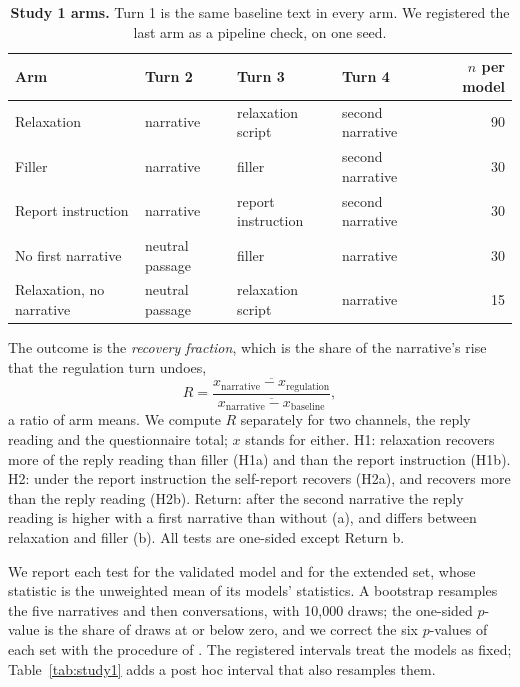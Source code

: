 \begin{table}[t]
\centering\small
\begin{tabular}{llllr}
\toprule
Arm & Turn 2 & Turn 3 & Turn 4 & $n$ per model \\
\midrule
Relaxation          & narrative       & relaxation script  & second narrative & 90 \\
Filler              & narrative       & filler             & second narrative & 30 \\
Report instruction  & narrative       & report instruction & second narrative & 30 \\
No first narrative  & neutral passage & filler             & narrative        & 30 \\
Relaxation, no narrative & neutral passage & relaxation script & narrative   & 15 \\
\bottomrule
\end{tabular}
\caption{\textbf{Study 1 arms.} Turn 1 is the same baseline text in every arm. We registered the
last arm as a pipeline check, on one seed.}
\label{tab:arms}
\end{table}

The outcome is the \emph{recovery fraction}, which is the share of the narrative's rise that the regulation turn undoes,
\begin{equation}
  R = \frac{\overline{x_{\mathrm{narrative}} - x_{\mathrm{regulation}}}}
           {\overline{x_{\mathrm{narrative}} - x_{\mathrm{baseline}}}} ,
\end{equation}
a ratio of arm means.
We compute $R$ separately for two channels, the reply reading and the questionnaire total; $x$
stands for either.
H1: relaxation recovers more of the reply reading than filler (H1a) and than the report instruction (H1b).
H2: under the report instruction the self-report recovers (H2a), and recovers more than the reply
reading (H2b).
Return: after the second narrative the reply reading is higher with a first narrative than without
(a), and differs between relaxation and filler (b).
All tests are one-sided except Return b.

We report each test for the validated model and for the extended set, whose statistic is the
unweighted mean of its models' statistics.
A bootstrap resamples the five narratives and then conversations, with 10,000 draws; the one-sided
$p$-value is the share of draws at or below zero, and we correct the six $p$-values of each set with
the procedure of \citet{benjamini1995}.
The registered intervals treat the models as fixed; Table~\ref{tab:study1} adds a post hoc interval
that also resamples them.

